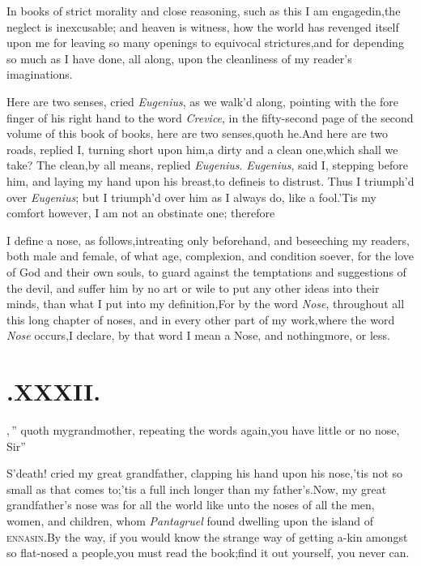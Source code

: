 \documentclass{article}
\begin{document}
In books of strict morality and close reasoning, such as this I am
engaged\break in,\tsk the neglect is inexcusable; and hea\-ven is witness,
how the world has re\-venged itself upon me for leaving so many
openings to equivocal strictures,\tsk and for depending so much as
I have done, all along, upon the cleanliness of my reader’s
imaginations.

\tsh Here are two senses, cried \textit{Eu\-genius}, as we walk’d
along, pointing with the fore finger of his right hand to the
word \textit{Crevice}, in the fifty-second page of the second
volume of this book of books,
\tsh here are two senses,\tsk quoth he.\tsk And here are two
roads, replied I, turning short upon him,\tsh a dirty and a
clean one,\tsh which shall we take?\tsk\break
The clean,\tsk by all means, replied \textit{Eu\-genius}.  \textit{Eugenius},
said I, stepping before him, and laying my hand upon his\break
breast,\tsh to define\tsh is to distrust.\tsh\break
Thus I triumph’d over \textit{Eugenius}; but I triumph’d over
him as I always do, like a fool.\tsh ’Tis my comfort however, I
am not an obstinate one; therefore

I define a nose, as follows,\tsh intreat\-ing only beforehand, and
beseeching my readers, both male and female, of what age,
complexion, and condition soever, for the love of God and their own
souls, to guard against the temptations and suggestions of the
devil, and suffer him by no art or wile to put any other
ideas
into their minds, than what I put into my definition,\tsk For by
the word \textit{Nose}, throughout all this long chapter of
noses, and in every other part of my work,\break where the word
\textit{Nose} occurs,\tsk I declare, by that word I mean a Nose,
and nothing\break more, or less.

\section{.\quad  XXXII.}

,\,”
quoth my\break grandmother, repeating the\break
words again,\tsk\lqq you have little or no\break
\lqq nose, Sir”\tsh

S’death! cried my great grandfather, clapping his hand
upon his nose,\tsk ’tis not so small as that comes
to;\tsk ’tis a full inch longer than my
father’s.\tsk Now, my great grandfather’s nose was
for all
the world like unto the noses of all the men, women, and
children, whom \textit{Pantagruel} found dwelling upon the
island of \textsc{ennasin}.\tsh By the way, if you would know
the strange way of getting a-kin amongst so flat-nosed a
people,\tsk you must read the book;\tsk find it out yourself,
you never can.\tsh
\end{document}
